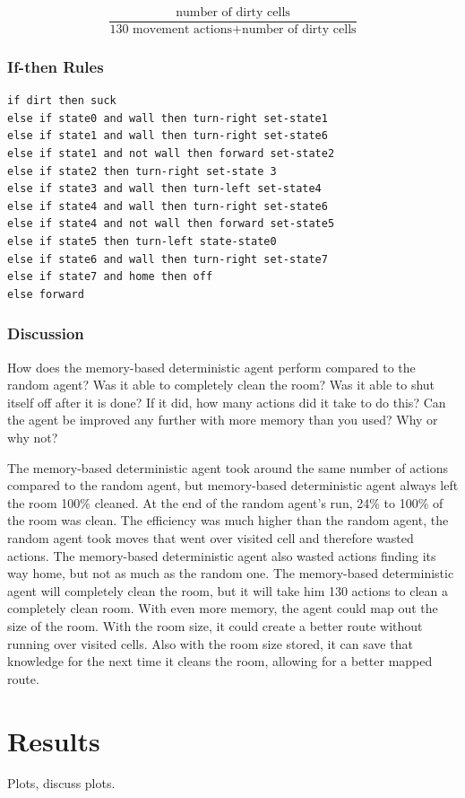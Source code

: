 \documentclass[a4paper,10pt]{article}
\begin{document}
\[\frac{\mbox{number of dirty cells}}{\mbox{130 movement actions} + \mbox{number of dirty cells}}\] 

\subsubsection{If-then Rules}
\begin{verbatim}
if dirt then suck
else if state0 and wall then turn-right set-state1
else if state1 and wall then turn-right set-state6
else if state1 and not wall then forward set-state2
else if state2 then turn-right set-state 3
else if state3 and wall then turn-left set-state4
else if state4 and wall then turn-right set-state6
else if state4 and not wall then forward set-state5
else if state5 then turn-left state-state0
else if state6 and wall then turn-right set-state7
else if state7 and home then off
else forward
\end{verbatim}

\subsubsection{Discussion}
How does the memory-based deterministic agent perform compared to the random agent? Was it able to completely clean the room? Was it able to shut itself off after it is done? If it did, how many actions did it take to do this? Can the agent be improved any further with more memory than you used? Why or why not?

The memory-based deterministic agent took around the same number of actions compared to the random agent, but memory-based deterministic agent always left the room 100\% cleaned.
At the end of the random agent's run, 24\% to 100\% of the room was clean.
The efficiency was much higher than the random agent, the random agent took moves that went over visited cell and therefore wasted actions.
The memory-based deterministic agent also wasted actions finding its way home, but not as much as the random one.
The memory-based deterministic agent will completely clean the room, but it will take him 130 actions to clean a completely clean room.
With even more memory, the agent could map out the size of the room.
With the room size, it could create a better route without running over visited cells.
Also with the room size stored, it can save that knowledge for the next time it cleans the room, allowing for a better mapped route.


\section{Results}
Plots, discuss plots.
\end{document}
